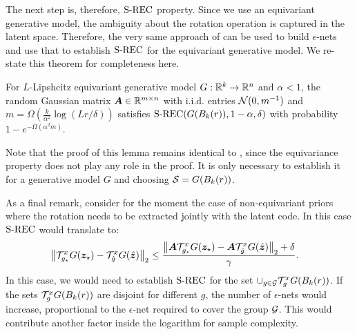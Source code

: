 The next step is, therefore, $\text{S-REC}$ property. Since we use an equivariant generative model, the ambiguity about the rotation operation is captured in the latent space. Therefore, the very same approach of \citet{Bora2017-as} can be used to build $\epsilon$-nets and use that to establish $\text{S-REC}$ for the equivariant generative model. We re-state this theorem for completeness here.

\begin{lemma}
For $L$-Lipshcitz equivariant generative model $G:\mathbb{R}^k\to\mathbb{R}^n$ and $\alpha<1$, the random Gaussian matrix ${\bm{A}}\in\mathbb{R}^{m\times n}$ with i.i.d. entries ${\mathcal{N}}(0,m^{-1})$ and $m =\Omega\left(\frac{k}{\alpha^2} \log (Lr/\delta)\right)$ satisfies $\text{S-REC}(G(B_k(r)),1-\alpha,\delta)$ with probability $1-e^{-\Omega(\alpha^2m)}$.
\end{lemma}

Note that the proof of this lemma remains identical to \citet{Bora2017-as}, since the equivariance property does not play any role in the proof. It  is only necessary to establish it for a generative model $G$ and choosing ${\mathcal{S}}=G(B_k(r))$.

As a final remark, consider for the moment the case of non-equivariant priors where the rotation needs to be extracted jointly with the latent code. In this case $\text{S-REC}$ would translate to:
\begin{align}
    \left\|{\mathcal{T}}_{g_\star}^x G({\bm{z}}_\star)- {\mathcal{T}}_{\hat{g}}^x G(\hat{{\bm{z}}})\right\|_2&\leq 
 \frac{\left\|{\bm{A}} {\mathcal{T}}_{g_\star}^x G({\bm{z}}_\star)-{\bm{A}} {\mathcal{T}}_{\hat{g}}^x G(\hat{{\bm{z}}})\right\|_2+ \delta}{\gamma}.
\end{align}
In this case, we would need to establish $\text{S-REC}$ for the set $\cup_{g\in{\mathcal{G}}}{\mathcal{T}}_{g}^x G(B_k(r))$. If the sets ${\mathcal{T}}_{g}^x G(B_k(r))$ are disjoint for different $g$, the number of $\epsilon$-nets would increase, proportional to the $\epsilon$-net required to cover the group ${\mathcal{G}}$. This would contribute another factor inside the logarithm for sample complexity.




\newpage
